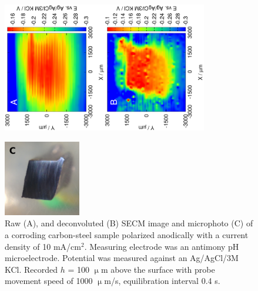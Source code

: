 \begin{figure}
\centering
\includegraphics[trim = 10mm 30mm 0mm 10mm, clip, width=0.4\textwidth, angle=-90]{img/carbon_steel/16012906.eps}\includegraphics[trim = 10mm 30mm 0mm 10mm, clip, width=0.4\textwidth, angle=-90]{img/carbon_steel/16012906_deconvoluted.eps}

\includegraphics[width=0.3\textwidth]{img/carbon_steel/cs_cut.jpg}

\caption[Raw, and deconvoluted SECM image and microphoto of a corroding carbon-steel sample polarized anodically.]{Raw (A), and deconvoluted (B) SECM image and microphoto (C) of a corroding carbon-steel sample polarized anodically with a current density of 10 mA/cm$^2$.
Measuring electrode was an antimony pH microelectrode.
Potential was measured against an Ag/AgCl/3M KCl.
Recorded $h$ = 100 $\upmu$m above the surface with probe movement speed of 1000 $\upmu$m/s, equilibration interval 0.4 s.}
\label{fig:carbon_steel}
\end{figure}

